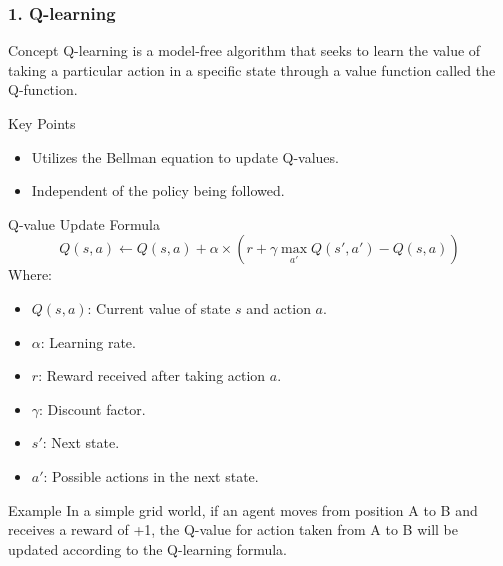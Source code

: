 \documentclass[aspectratio=169]{beamer}
\begin{document}
\begin{frame}[fragile]
    \frametitle{1. Q-learning}
    
    \begin{block}{Concept}
        Q-learning is a model-free algorithm that seeks to learn the value of taking a particular action in a specific state through a value function called the Q-function.
    \end{block}
    
    \begin{block}{Key Points}
        \begin{itemize}
            \item Utilizes the Bellman equation to update Q-values.
            \item Independent of the policy being followed.
        \end{itemize}
    \end{block}
    
    \begin{block}{Q-value Update Formula}
        \begin{equation}
            Q(s, a) \leftarrow Q(s, a) + \alpha \times \left( r + \gamma \max_{a'} Q(s', a') - Q(s, a) \right)
        \end{equation}
        Where:
        \begin{itemize}
            \item \( Q(s, a) \): Current value of state \( s \) and action \( a \).
            \item \( \alpha \): Learning rate.
            \item \( r \): Reward received after taking action \( a \).
            \item \( \gamma \): Discount factor.
            \item \( s' \): Next state.
            \item \( a' \): Possible actions in the next state.
        \end{itemize}
    \end{block}
    
    \begin{block}{Example}
        In a simple grid world, if an agent moves from position A to B and receives a reward of +1, the Q-value for action taken from A to B will be updated according to the Q-learning formula.
    \end{block}
\end{frame}
\end{document}
